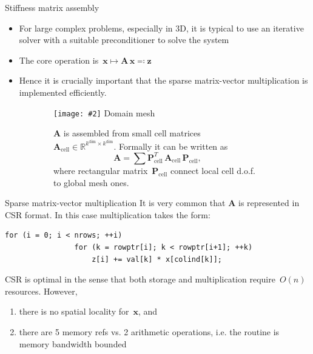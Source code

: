 \documentclass[svgnames]{beamer} %
\newcommand{\includegraphicsw}[2][1.]{\texttt{[image: \#2]}}
\newcommand{\vect}[1]{\boldsymbol{\mathbf{#1}}}
\begin{document}
	\begin{frame}{Stiffness matrix assembly}
		\begin{itemize}
		\item For large complex problems, especially in 3D, it is typical to use an iterative solver with a suitable preconditioner to solve the system
		\item The core operation is~$\vect x \mapsto \vect A\,\vect x \eqqcolon \vect z$
		\item Hence it is crucially important that the sparse matrix-vector multiplication is implemented efficiently.
		\end{itemize}
		\begin{figure}

			\begin{subfigure}{.45\linewidth}
				\centering
				\includegraphicsw[.8]{mesh.png}
				Domain mesh
			\end{subfigure}%
			\begin{subfigure}{.55\linewidth}
				$\vect A$ is assembled from small cell matrices~$\vect A_\text{cell} \in \mathbb R^{k^{\text{dim}}\times k^{\text{dim}}}$. Formally it can be written as
				$$
					\vect A = \sum \vect P^T_\text{cell}\,\vect A_\text{cell}\,\vect P_\text{cell},
				$$
				where rectangular matrix~$\vect P_\text{cell}$ connect local cell d.o.f. to global mesh ones.
			\end{subfigure}
		\end{figure}
	\end{frame}	

	\begin{frame}[fragile]{Sparse matrix-vector multiplication}
		It is very common that $\vect A$ is represented in CSR format. In this case multiplication takes the form:
		\begin{lstlisting}[basicstyle=\small]
			for (i = 0; i < nrows; ++i) 
				for (k = rowptr[i]; k < rowptr[i+1]; ++k)
					z[i] += val[k] * x[colind[k]];
		\end{lstlisting}
		CSR is optimal in the sense that both storage and multiplication require~$O(n)$ resources. However,
		\begin{enumerate}
			\item there is no spatial locality for~$\vect x$, and
			\item there are 5 memory refs vs. 2 arithmetic operations, i.e. the routine is memory bandwidth bounded
		\end{enumerate}
	\end{frame}	
	
\end{document}
